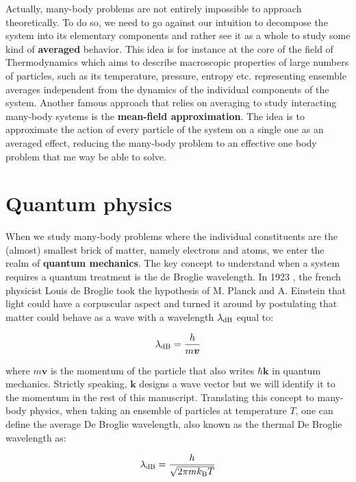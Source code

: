 Actually, many-body problems are not entirely impossible to approach theoretically. To do so, we need to go against our intuition to decompose the system into its elementary components and rather see it as a whole to study some kind of \textbf{averaged} behavior. This idea is for instance at the core of the field of Thermodynamics which aims to describe macroscopic properties of large numbers of particles, such as its temperature, pressure, entropy etc. representing ensemble averages independent from the dynamics of the individual components of the system. Another famous approach that relies on averaging to study interacting many-body systems is the \textbf{mean-field approximation}. The idea is to approximate the action of every particle of the system on a single one as an averaged effect, reducing the many-body problem to an effective one body problem that me way be able to solve.

\section*{Quantum physics}

When we study many-body problems where the individual constituents are the (almost) smallest brick of matter, namely electrons and atoms, we enter the realm of \textbf{quantum mechanics}. The key concept to understand when a system requires a quantum treatment is the de Broglie wavelength. In 1923 \cite{debroglie:tel-00006807}, the french physicist Louis de Broglie took the hypothesis of M. Planck and A. Einstein that light could have a corpuscular aspect and turned it around by postulating that matter could behave as a wave with a wavelength $\lambda_{\rm{dB}}$ equal to:

\begin{equation}
    \lambda_{\rm{dB}} = \frac{h}{m\bm{v}}
\end{equation}

\noindent where $m\bm{v}$ is the momentum of the particle that also writes $\hbar \bm{k}$ in quantum mechanics. Strictly speaking, $\bm{k}$ designs a wave vector but we will identify it to the momentum in the rest of this manuscript. Translating this concept to many-body physics, when taking an ensemble of particles at temperature $T$, one can define the average De Broglie wavelength, also known as the thermal De Broglie wavelength as:

\begin{equation}
    \lambda_{\rm{dB}} = \frac{h}{\sqrt{2 \pi m k_{\mathrm{B}} T}}
\end{equation}

